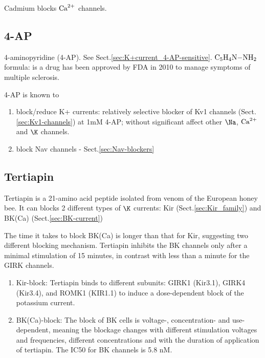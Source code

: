 Cadmium blocks ${\text{Ca}^{2+}}$ channels.

\subsection{4-AP}
\label{sec:4-AP}

4-aminopyridine (4-AP). See Sect.\ref{sec:K+current_4-AP-sensitive}.
$\ce{C5H4N-NH2}$ formula: is a drug has been approved by FDA in 2010 to manage
symptoms of multiple sclerosis. 

4-AP is known to
\begin{enumerate}
  \item block/reduce K+ currents: relatively selective blocker of Kv1 channels
  (Sect.\ref{sec:Kv1-channels}) at 1mM 4-AP; without significant affect other $\Na$, ${\text{Ca}^{2+}}$ and $\K$ channels. 
  
   \item block Nav channels - Sect.\ref{sec:Nav-blockers}
\end{enumerate}

\subsection{Tertiapin}

Tertiapin is a 21-amino acid peptide isolated from venom of the European honey
bee. It can blocks 2 different types of $\K$ currents: Kir
(Sect.\ref{sec:Kir_family}) and BK(Ca) (Sect.\ref{sec:BK-current})

The time it takes to block BK(Ca) is longer than that for Kir, suggesting two
different blocking mechanism. Tertiapin inhibits the BK channels only after a
minimal stimulation of 15 minutes, in contrast with less than a minute for the
GIRK channels.

\begin{enumerate}
  \item Kir-block:
  Tertiapin binds to different subunits: GIRK1 (Kir3.1), GIRK4 (Kir3.4), and
  ROMK1 (KIR1.1) to induce a dose-dependent block of the potassium current.
  
  \item BK(Ca)-block:
  The block of BK cells is voltage-, concentration- and use-dependent, meaning
  the blockage changes with different stimulation voltages and frequencies,
  different concentrations and with the duration of application of tertiapin.
  The IC50 for BK channels is 5.8 nM.
  
\end{enumerate}


